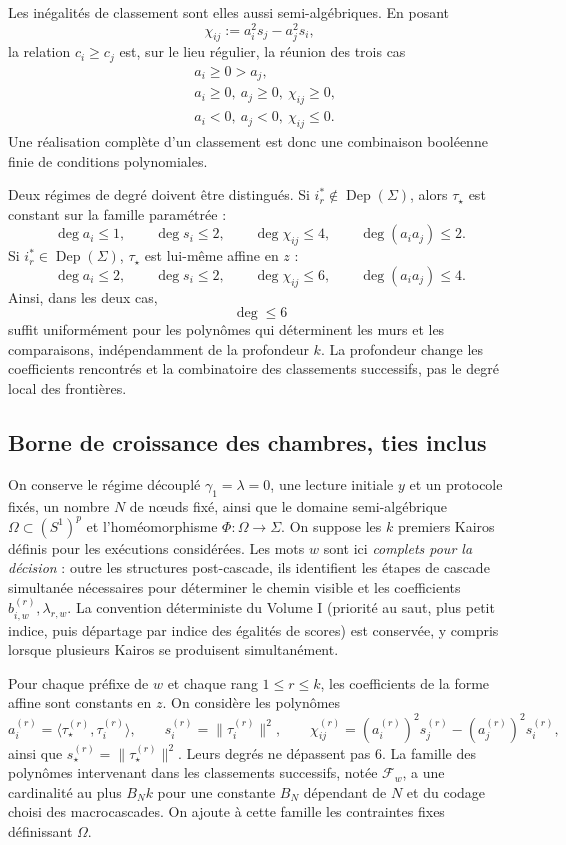 \documentclass[11pt,a4paper]{article}
\theoremstyle{definition}
\theoremstyle{remark}
\begin{document}
Les inégalités de classement sont elles aussi semi-algébriques. En posant
\[
 \chi_{ij}:=a_i^2s_j-a_j^2s_i,
\]
la relation $c_i\ge c_j$ est, sur le lieu régulier, la réunion des trois cas
\[
 \begin{aligned}
 &a_i\ge0>a_j,\\
 &a_i\ge0,\ a_j\ge0,\ \chi_{ij}\ge0,\\
 &a_i<0,\ a_j<0,\ \chi_{ij}\le0.
 \end{aligned}
\]
Une réalisation complète d'un classement est donc une combinaison booléenne finie de conditions polynomiales.

Deux régimes de degré doivent être distingués. Si $i_r^*\notin\operatorname{Dep}(\Sigma)$, alors $\tau_\star$ est constant sur la famille paramétrée :
\[
 \deg a_i\le1,
 \qquad
 \deg s_i\le2,
 \qquad
 \deg \chi_{ij}\le4,
 \qquad
 \deg(a_ia_j)\le2.
\]
Si $i_r^*\in\operatorname{Dep}(\Sigma)$, $\tau_\star$ est lui-même affine en $z$ :
\[
 \deg a_i\le2,
 \qquad
 \deg s_i\le2,
 \qquad
 \deg \chi_{ij}\le6,
 \qquad
 \deg(a_ia_j)\le4.
\]
Ainsi, dans les deux cas,
\[
 \boxed{\deg\le6}
\]
suffit uniformément pour les polynômes qui déterminent les murs et les comparaisons, indépendamment de la profondeur $k$. La profondeur change les coefficients rencontrés et la combinatoire des classements successifs, pas le degré local des frontières.

\subsection{Borne de croissance des chambres, ties inclus}

On conserve le régime découplé $\gamma_1=\lambda=0$, une lecture initiale $y$ et un protocole fixés, un nombre $N$ de nœuds fixé, ainsi que le domaine semi-algébrique $\Omega\subset(S^1)^p$ et l'homéomorphisme $\Phi:\Omega\to\Sigma$. On suppose les $k$ premiers Kairos définis pour les exécutions considérées. Les mots $w$ sont ici \emph{complets pour la décision} : outre les structures post-cascade, ils identifient les étapes de cascade simultanée nécessaires pour déterminer le chemin visible et les coefficients $b_{i,w}^{(r)},\lambda_{r,w}$. La convention déterministe du Volume I (priorité au saut, plus petit indice, puis départage par indice des égalités de scores) est conservée, y compris lorsque plusieurs Kairos se produisent simultanément.

Pour chaque préfixe de $w$ et chaque rang $1\le r\le k$, les coefficients de la forme affine sont constants en $z$. On considère les polynômes
\[
 a_i^{(r)}=\langle\tau_\star^{(r)},\tau_i^{(r)}\rangle,\qquad
 s_i^{(r)}=\|\tau_i^{(r)}\|^2,\qquad
 \chi_{ij}^{(r)}=(a_i^{(r)})^2s_j^{(r)}-(a_j^{(r)})^2s_i^{(r)},
\]
ainsi que $s_\star^{(r)}=\|\tau_\star^{(r)}\|^2$. Leurs degrés ne dépassent pas $6$. La famille des polynômes intervenant dans les classements successifs, notée $\mathscr F_w$, a une cardinalité au plus $B_N k$ pour une constante $B_N$ dépendant de $N$ et du codage choisi des macrocascades. On ajoute à cette famille les contraintes fixes définissant $\Omega$.
\end{document}
